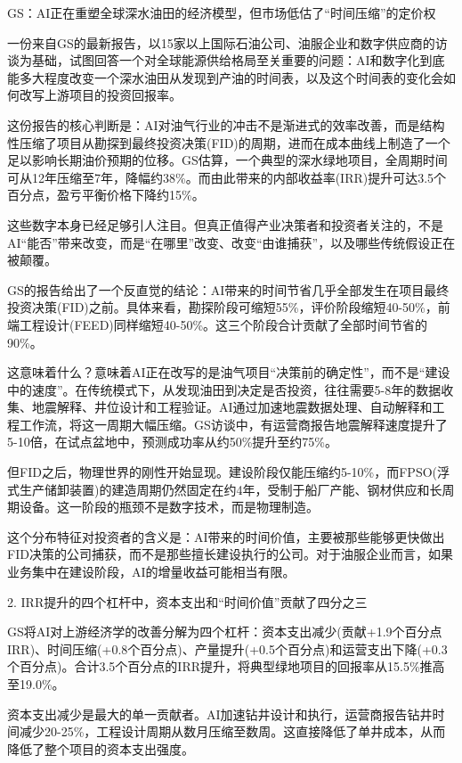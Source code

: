 \documentclass[11pt]{ctexart}
\begin{document}
GS：AI正在重塑全球深水油田的经济模型，但市场低估了“时间压缩”的定价权

一份来自GS的最新报告，以15家以上国际石油公司、油服企业和数字供应商的访谈为基础，试图回答一个对全球能源供给格局至关重要的问题：AI和数字化到底能多大程度改变一个深水油田从发现到产油的时间表，以及这个时间表的变化会如何改写上游项目的投资回报率。

这份报告的核心判断是：AI对油气行业的冲击不是渐进式的效率改善，而是结构性压缩了项目从勘探到最终投资决策(FID)的周期，进而在成本曲线上制造了一个足以影响长期油价预期的位移。GS估算，一个典型的深水绿地项目，全周期时间可从12年压缩至7年，降幅约38\%。而由此带来的内部收益率(IRR)提升可达3.5个百分点，盈亏平衡价格下降约15\%。

这些数字本身已经足够引人注目。但真正值得产业决策者和投资者关注的，不是AI“能否”带来改变，而是“在哪里”改变、改变“由谁捕获”，以及哪些传统假设正在被颠覆。

GS的报告给出了一个反直觉的结论：AI带来的时间节省几乎全部发生在项目最终投资决策(FID)之前。具体来看，勘探阶段可缩短55\%，评价阶段缩短40-50\%，前端工程设计(FEED)同样缩短40-50\%。这三个阶段合计贡献了全部时间节省的90\%。

这意味着什么？意味着AI正在改写的是油气项目“决策前的确定性”，而不是“建设中的速度”。在传统模式下，从发现油田到决定是否投资，往往需要5-8年的数据收集、地震解释、井位设计和工程验证。AI通过加速地震数据处理、自动解释和工程工作流，将这一周期大幅压缩。GS访谈中，有运营商报告地震解释速度提升了5-10倍，在试点盆地中，预测成功率从约50\%提升至约75\%。

但FID之后，物理世界的刚性开始显现。建设阶段仅能压缩约5-10\%，而FPSO(浮式生产储卸装置)的建造周期仍然固定在约4年，受制于船厂产能、钢材供应和长周期设备。这一阶段的瓶颈不是数字技术，而是物理制造。

这个分布特征对投资者的含义是：AI带来的时间价值，主要被那些能够更快做出FID决策的公司捕获，而不是那些擅长建设执行的公司。对于油服企业而言，如果业务集中在建设阶段，AI的增量收益可能相当有限。

2. IRR提升的四个杠杆中，资本支出和“时间价值”贡献了四分之三

GS将AI对上游经济学的改善分解为四个杠杆：资本支出减少(贡献+1.9个百分点IRR)、时间压缩(+0.8个百分点)、产量提升(+0.5个百分点)和运营支出下降(+0.3个百分点)。合计3.5个百分点的IRR提升，将典型绿地项目的回报率从15.5\%推高至19.0\%。

资本支出减少是最大的单一贡献者。AI加速钻井设计和执行，运营商报告钻井时间减少20-25\%，工程设计周期从数月压缩至数周。这直接降低了单井成本，从而降低了整个项目的资本支出强度。
\end{document}
